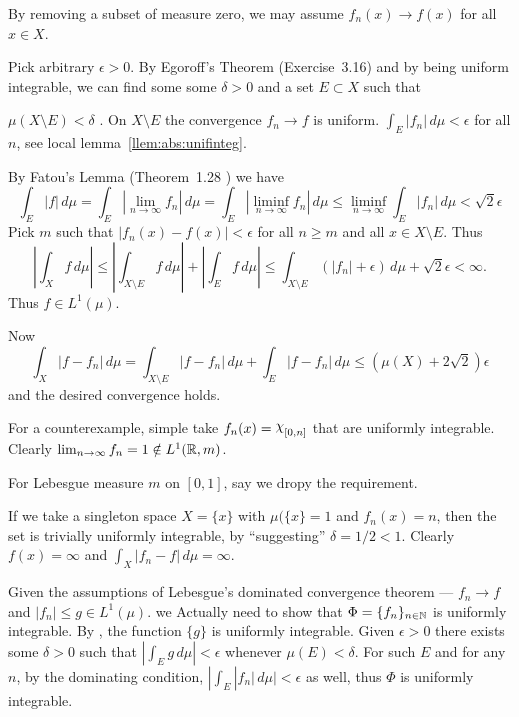 \begin{enumerate}
\begin{itemize}
By removing a subset of measure zero, we may assume
\(f_n(x) \to f(x)\) for all \(x\in X\).

Pick arbitrary \(\epsilon>0\).
By Egoroff's Theorem (Exercise~3.16)  
and by being uniform integrable, 
we can find some some \(\delta>0\) and a set \(E\subset X\) such that 
\begin{enumerate}
 \(\mu(X\setminus E)<\delta\) .
 On \(X\setminus E\) the convergence \(f_n \to f\) is uniform.
 \(\int_E |f_n|\,d\mu < \epsilon\) for all $n$, 
      see local lemma~\ref{llem:abs:unifinteg}.
\end{enumerate}
By Fatou's Lemma (Theorem~1.28 \cite{RudinRCA87}) we have
\begin{equation*}
\int_E |f|\,d\mu 
= \int_E |\lim_{n\to\infty}f_n|\,d\mu 
= \int_E |\liminf_{n\to\infty}f_n|\,d\mu 
\leq \liminf_{n\to\infty} \int_E |f_n|\,d\mu < \sqrt{2}\epsilon
\end{equation*}
Pick $m$ such that \(|f_n(x)-f(x)| < \epsilon\)
for all \(n\geq m\) and all \(x\in X\setminus E\).
Thus
\begin{equation*}
\left|\int_X f\,d\mu\right|
\leq
  \left|\int_{X\setminus E} f\,d\mu\right|
+ \left|\int_E f\,d\mu\right|
\leq
  \int_{X\setminus E} (|f_n| + \epsilon)\,d\mu + \sqrt{2}\epsilon < \infty.
\end{equation*}
Thus \(f\in L^1(\mu)\).

Now
\begin{equation*}
\int_X |f-f_n|\,d\mu
= \int_{X\setminus E} |f-f_n|\,d\mu + \int_E |f-f_n|\,d\mu 
\leq (\mu(X) + 2\sqrt{2})\epsilon
\end{equation*}
and the desired convergence holds.

For a counterexample, simple take \(f_n(x) = \chhi_{[0,n]}\)
that are uniformly integrable.
Clearly \(\lim_{n\to\infty} f_n = 1 \notin L^1(\mathbb{R},m)\).

For Lebesgue measure $m$ on \([0,1]\), say we dropy the 
 requirement.

If we take a singleton space \(X=\{x\}\) with \(\mu(\{x\}=1\)
and \(f_n(x)=n\), then the set is trivially uniformly integrable,
by ``suggesting'' \(\delta=1/2<1\).
Clearly \(f(x)=\infty\) and \(\int_X|f_n-f|\,d\mu=\infty\).

Given the assumptions of Lebesgue's dominated convergence theorem ---
\(f_n\to f\) and \(|f_n|\leq g\in L^1(\mu)\).
we Actually need to show that \(\Phi=\{f_n\}_{n\in\mathbb{N}}\) 
is uniformly integrable.
By , the function \(\{g\}\) is uniformly integrable.
Given \(\epsilon>0\) there exists some \(\delta>0\) 
such that \(|\int_E g\,d\mu|<\epsilon\) whenever \(\mu(E)<\delta\).
For such $E$ and for any $n$, by the dominating condition, 
\(|\int_E |f_n|\,d\mu|<\epsilon\) as well, thus
\(\Phi\) is uniformly integrable.


\end{itemize}
\end{enumerate}
